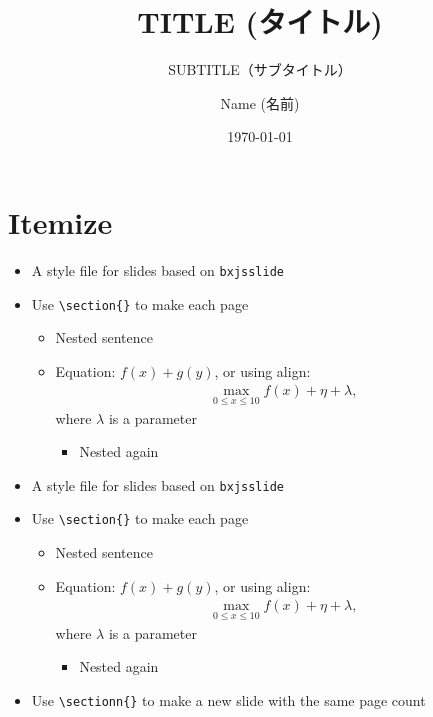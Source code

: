 \documentclass[xelatex,ja=standard,jafont=hiragino-pron,fleqn,no-math,25pt,paper={190.5truemm}{254truemm},english]{bxjsslidemd}
\title{TITLE (タイトル)}
\subtitle{SUBTITLE（サブタイトル）}
\author{Name (名前)}
\date{\today}
\begin{document}
\maketitle

\section{Itemize}
\begin{itemize}
 \item A style file for slides based on \texttt{bxjsslide}
 \item Use \verb|\section{}| to make each page
       \begin{itemize}
	\item Nested sentence
	\item Equation: $f(x) + g(y)$, or using align:
	      \begin{align*}
	       \max_{0 \le x \le 10} f(x) + \eta + \lambda,
	      \end{align*}
	      where $\lambda$ is a parameter
	      \begin{itemize}
	       \item Nested again
	      \end{itemize}
       \end{itemize}
 \end{itemize}

\begin{itemize}
 \item A style file for slides based on \texttt{bxjsslide}
 \item Use \verb|\section{}| to make each page
       \begin{itemize}
	\item Nested sentence
	\item Equation: $f(x) + g(y)$, or using align:
	      \begin{align*}
	       \max_{0 \le x \le 10} f(x) + \eta + \lambda,
	      \end{align*}
	      where $\lambda$ is a parameter
	      \begin{itemize}
	       \item Nested again
	      \end{itemize}
       \end{itemize}
 \item Use \verb|\sectionn{}| to make a new slide with the same page count
\end{itemize}
\end{document}
